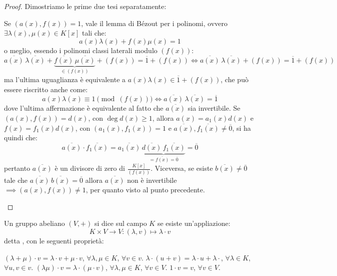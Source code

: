 \documentclass[11pt]{scrartcl}
\begin{document}
\begin{proof}
Dimostriamo le prime due tesi separatamente:
	\begin{enumerate}[(1)]
	\ii Se $(a(x),f(x)) = 1$, vale il lemma di Bézout per i polinomi, ovvero $\exists \lambda(x), \mu(x) \in K[x]$ tali che:
		\[ 	a(x)\lambda(x) + f(x)\mu(x) = 1
		\]
o meglio, essendo i polinomi classi laterali modulo $(f(x))$:
		\[ \overline{a(x)}\,\overline{\lambda(x)} + \underbrace{\overline{f(x)}\,\overline{\mu(x)}}_{\in (f(x))} + (f(x)) = \overline 1 + (f(x)) \iff \overline{a(x)}\,\overline{\lambda(x)} + (f(x)) = \overline 1 + (f(x))
		\]
ma l'ultima uguaglianza è equivalente a $a(x)\lambda(x) \in \overline 1 + (f(x))$, che può essere riscritto anche come:
		\[ a(x)\lambda(x) \equiv 1 \pmod{(f(x))} \iff \overline{a(x)}\, \overline{\lambda(x)} = \overline 1
		\]
dove l'ultima affermazione è equivalente al fatto che $\overline{a(x)}$ sia invertibile.
	\ii Se $(a(x),f(x)) = d(x)$, con $\deg d(x) \geq 1$, allora $a(x)=a_1(x)d(x)$ e $f(x)=f_1(x)d(x)$, con $(a_1(x),f_1(x))=1$ e $\overline{a(x)},\overline{f_1(x)} \ne \overline 0$, si ha quindi che:
		\[ \overline{a(x)}\cdot\overline{f_1(x)} =  \overline{a_1(x)}\,\underbrace{\overline{d(x)}\, \overline{f_1(x)}}_{= \overline{f(x)} = \overline 0} = \overline 0
		\]
		pertanto $\overline{a(x)}$ è un divisore di zero di $\frac{K[x]}{(f(x))}$. Viceversa, se esiste $\overline{b(x)} \ne \overline 0$ tale che $\overline{a(x)}\,\overline{b(x)} = \overline 0$
		allora $\overline{a(x)}$ non è invertibile $\implies (a(x),f(x)) \ne 1$, per quanto visto al punto precedente.
	\end{enumerate}
\end{proof}

\begin{remark}
Un gruppo abeliano $(V,+)$ si dice  sul campo $K$ se esiste un'appliazione:
	\[ K \times V \longrightarrow V : (\lambda,v) \longmapsto \lambda \cdot v
		\]
detta , con le seguenti proprietà:
	\begin{enumerate}[(i)]
		\ii $(\lambda + \mu)\cdot v = \lambda\cdot v + \mu \cdot v$, $\forall \lambda,\mu \in K$, $\forall v \in v$.
		\ii $\lambda \cdot (u + v) = \lambda \cdot u + \lambda \cdot$, $\forall \lambda \in K$, $\forall u,v \in v$.
		\ii $(\lambda\mu)\cdot v  = \lambda\cdot(\mu\cdot v)$, $\forall \lambda,\mu \in K$, $\forall v \in V$.
		\ii $1 \cdot v = v$, $\forall v \in V$.
	\end{enumerate}
\end{remark}
\end{document}
